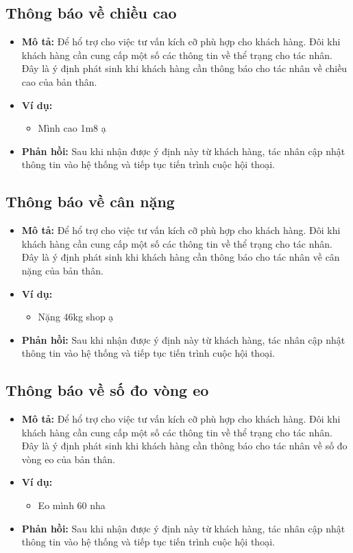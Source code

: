 \subsection{Thông báo về chiều cao}
\begin{itemize}
    \item \textbf{Mô tả:} Để hổ trợ cho việc tư vấn kích cỡ phù hợp
    cho khách hàng. Đôi khi khách hàng cần cung cấp một số các
    thông tin về thể trạng cho tác nhân. Đây là ý định phát sinh khi
    khách hàng cần thông báo cho tác nhân về chiều cao của bản thân.
    \item \textbf{Ví dụ:}
    \begin{itemize}
        \item Mình cao 1m8 ạ
    \end{itemize}
    \item \textbf{Phản hồi:} Sau khi nhận được ý định này từ
    khách hàng, tác nhân cập nhật thông tin vào hệ thống và
    tiếp tục tiến trình cuộc hội thoại.
\end{itemize}

\subsection{Thông báo về cân nặng}
\begin{itemize}
    \item \textbf{Mô tả:} Để hổ trợ cho việc tư vấn kích cỡ phù hợp
    cho khách hàng. Đôi khi khách hàng cần cung cấp một số các
    thông tin về thể trạng cho tác nhân. Đây là ý định phát sinh khi
    khách hàng cần thông báo cho tác nhân về cân nặng của bản thân.
    \item \textbf{Ví dụ:}
    \begin{itemize}
        \item Nặng 46kg shop ạ
    \end{itemize}
    \item \textbf{Phản hồi:} Sau khi nhận được ý định này từ
    khách hàng, tác nhân cập nhật thông tin vào hệ thống và
    tiếp tục tiến trình cuộc hội thoại.
\end{itemize}

\subsection{Thông báo về số đo vòng eo}
\begin{itemize}
    \item \textbf{Mô tả:} Để hổ trợ cho việc tư vấn kích cỡ phù hợp
    cho khách hàng. Đôi khi khách hàng cần cung cấp một số các
    thông tin về thể trạng cho tác nhân. Đây là ý định phát sinh
    khi khách hàng cần thông báo cho tác nhân về số đo vòng eo
    của bản thân.
    \item \textbf{Ví dụ:}
    \begin{itemize}
        \item Eo mình 60 nha
    \end{itemize}
    \item \textbf{Phản hồi:} Sau khi nhận được ý định này từ
    khách hàng, tác nhân cập nhật thông tin vào hệ thống và
    tiếp tục tiến trình cuộc hội thoại.
\end{itemize}

